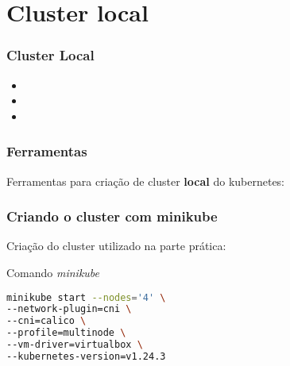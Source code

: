 \section{Cluster local}

\begin{frame}
\frametitle{Cluster Local}
\begin{itemize}
	\item {}
	\item {}
	\item {}
\end{itemize}
\end{frame}

\begin{frame}
\frametitle{Ferramentas}
Ferramentas para criação de cluster \textbf{local} do kubernetes:
\begin{itemize}
\end{itemize}
\end{frame}

\begin{frame}[containsverbatim]
\frametitle{Criando o cluster com minikube}
Criação do cluster utilizado na parte prática:
\begin{center}
\begin{minipage}{0.9\textwidth}
\begin{block}{Comando \textit{minikube}}
\begin{lstlisting}[language=bash]
minikube start --nodes='4' \
--network-plugin=cni \
--cni=calico \
--profile=multinode \
--vm-driver=virtualbox \
--kubernetes-version=v1.24.3
\end{lstlisting}
\end{block}
\end{minipage}
\end{center}
\end{frame}

